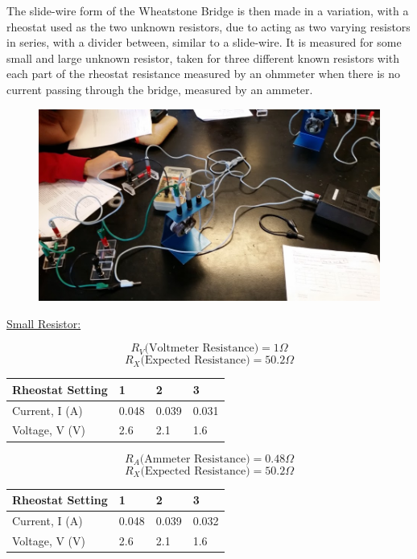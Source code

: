 \documentclass[11pt, titlepage]{article}
\begin{document}
The slide-wire form of the Wheatstone Bridge is then made in a variation, with a rheostat used as the two unknown resistors, due to acting as two varying resistors in series, with a divider between, similar to a slide-wire. It is measured for some small and large unknown resistor, taken for three different known resistors with each part of the rheostat resistance measured by an ohmmeter when there is no current passing through the bridge, measured by an ammeter.

\begin{figure}[h]
\centering
\hspace*{0cm}
\includegraphics[scale=0.7, angle=270]{lab13.jpg}
\vspace*{0cm}
\end{figure}

\underline{Small Resistor:}
\begin{center}
$$R_V \text{(Voltmeter Resistance)}= 1 \Omega$$
$$R_X \text{(Expected Resistance)}= 50.2 \Omega$$
\begin{tabular}
{|m{9em}|m{7em}|m{7em}|m{7em}|}
\hline
Rheostat Setting & 1 & 2 & 3 \\
\hline
Current, I (A) & 0.048 & 0.039 & 0.031 \\
\hline
Voltage, V (V) & 2.6 & 2.1 & 1.6 \\
\hline
\end{tabular}
\end{center}

\begin{center}
$$R_A \text{(Ammeter Resistance)}= 0.48 \Omega$$
$$R_X \text{(Expected Resistance)}= 50.2 \Omega$$
\begin{tabular}
{|m{9em}|m{7em}|m{7em}|m{7em}|}
\hline
Rheostat Setting & 1 & 2 & 3 \\
\hline
Current, I (A) & 0.048 & 0.039 & 0.032 \\
\hline
Voltage, V (V) & 2.6 & 2.1 & 1.6 \\
\hline
\end{tabular}
\end{center}
\end{document}
